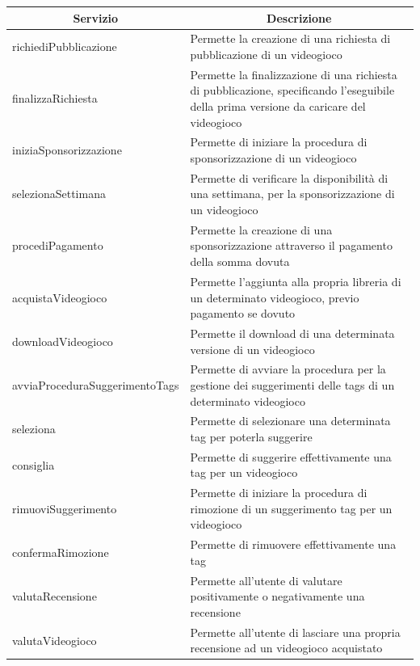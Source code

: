 \begin{center}
	\begin{tabular}{||l | p{20em}||} 
	\hline
	\multicolumn{1}{||c|}{\textbf{Servizio}} & \multicolumn{1}{c||}{\textbf{Descrizione}} \\
	\hline\hline
	richiediPubblicazione & Permette la creazione di una richiesta di pubblicazione di un videogioco \\
	\hline
	finalizzaRichiesta & Permette la finalizzazione di una richiesta di pubblicazione, specificando l’eseguibile della prima versione da caricare del videogioco \\
	\hline
	iniziaSponsorizzazione & Permette di iniziare la procedura di sponsorizzazione di un videogioco \\
	\hline
	selezionaSettimana & Permette di verificare la disponibilità di una settimana, per la sponsorizzazione di un videogioco \\
	\hline
	procediPagamento & Permette la creazione di una sponsorizzazione attraverso il pagamento della somma dovuta \\
	\hline
	acquistaVideogioco & Permette l’aggiunta alla propria libreria di un determinato videogioco, previo pagamento se dovuto \\
	\hline
	downloadVideogioco & Permette il download di una determinata versione di un videogioco \\
	\hline
	avviaProceduraSuggerimentoTags & Permette di avviare la procedura per la gestione dei suggerimenti delle tags di un determinato videogioco \\
	\hline
	seleziona & Permette di selezionare una determinata tag per poterla suggerire \\
	\hline
	consiglia & Permette di suggerire effettivamente una tag per un videogioco \\
	\hline
	rimuoviSuggerimento & Permette di iniziare la procedura di rimozione di un suggerimento tag per un videogioco \\
	\hline
	confermaRimozione & Permette di rimuovere effettivamente una tag \\
	\hline
	valutaRecensione & Permette all’utente di valutare positivamente o negativamente una recensione \\
	\hline
	valutaVideogioco & Permette all’utente di lasciare una propria recensione ad un videogioco acquistato \\
	\hline
   \end{tabular}
\end{center}

